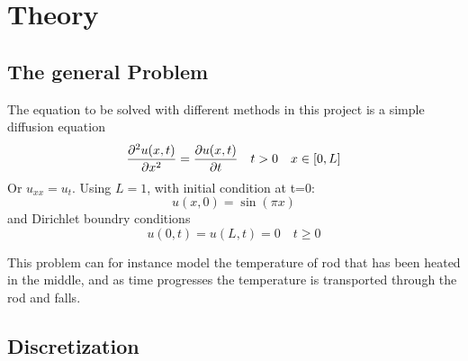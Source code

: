 \section{Theory}
\label{sec:theory}

\subsection{The general Problem}
The equation to be solved with different methods in this project is a simple diffusion equation
\begin{equation}
\pdv[2]{u(x,t)}{x} = \pdv{u(x,t)}{t} \quad t>0 \quad x\in [0,L]
    \label{eq:diffusionEQ}
\end{equation}
Or $u_{xx} = u_t$. Using $L=1$, with initial condition at t=0:
\begin{equation}
    u(x,0) = \sin(\pi x)
    \label{eq:initialCondition}
\end{equation}
and Dirichlet boundry conditions
\begin{equation*}
    u(0,t) = u(L,t) = 0 \quad t \geq 0
\end{equation*}

This problem can for instance model the temperature of rod that has been heated in the middle,
and as time progresses the temperature is transported through the rod and falls.

\subsection{Discretization}

